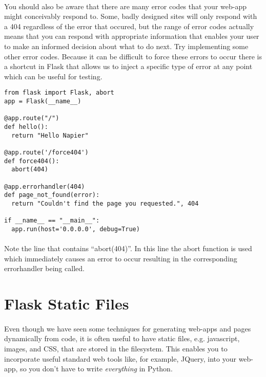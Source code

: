 \documentclass[12pt, a4paper, twoside]{book}
\begin{document}
\paragraph{} You should also be aware that there are many error codes that your web-app might conceivably respond to. Some, badly designed sites will only respond with a 404 regardless of the error that occured, but the range of error codes actually means that you can respond with appropriate information that enables your user to make an informed decision about what to do next. Try implementing some other error codes. Because it can be difficult to force these errors to occur there is a shortcut in Flask that allows us to inject a specific type of error at any point which can be useful for testing.

\begin{lstlisting}
from flask import Flask, abort
app = Flask(__name__)

@app.route("/")
def hello():
  return "Hello Napier"

@app.route('/force404')
def force404():
  abort(404)

@app.errorhandler(404)
def page_not_found(error):
  return "Couldn't find the page you requested.", 404

if __name__ == "__main__":
  app.run(host='0.0.0.0', debug=True)
\end{lstlisting}

\paragraph{} Note the line that contains ``abort(404)''. In this line the abort function is used which immediately causes an error to occur resulting in the corresponding errorhandler being called.

\section{Flask Static Files}
\label{static}
\paragraph{} Even though we have seen some techniques for generating web-apps and pages dynamically from code, it is often useful to have static files, e.g. javascript, images, and CSS, that are stored in the filesystem. This enables you to incorporate useful standard web tools like, for example, JQuery, into your web-app, so you don't have to write \emph{everything} in Python.
\end{document}
